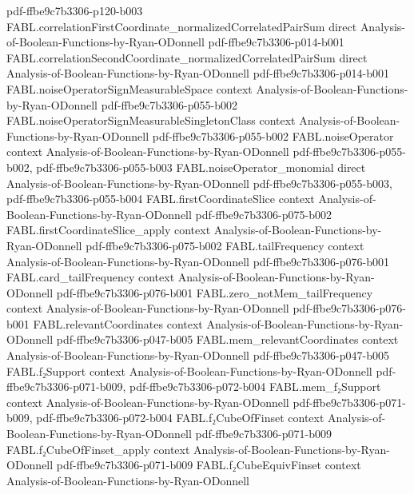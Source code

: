 \begin{theorem}
  {pdf-ffbe9c7b3306-p120-b003}
\proofstep
  {FABL.correlationFirstCoordinate_normalizedCorrelatedPairSum}
  {direct}
  {Analysis-of-Boolean-Functions-by-Ryan-ODonnell}
  {pdf-ffbe9c7b3306-p014-b001}
\proofstep
  {FABL.correlationSecondCoordinate_normalizedCorrelatedPairSum}
  {direct}
  {Analysis-of-Boolean-Functions-by-Ryan-ODonnell}
  {pdf-ffbe9c7b3306-p014-b001}
\proofstep
  {FABL.noiseOperatorSignMeasurableSpace}
  {context}
  {Analysis-of-Boolean-Functions-by-Ryan-ODonnell}
  {pdf-ffbe9c7b3306-p055-b002}
\proofstep
  {FABL.noiseOperatorSignMeasurableSingletonClass}
  {context}
  {Analysis-of-Boolean-Functions-by-Ryan-ODonnell}
  {pdf-ffbe9c7b3306-p055-b002}
\proofstep
  {FABL.noiseOperator}
  {context}
  {Analysis-of-Boolean-Functions-by-Ryan-ODonnell}
  {pdf-ffbe9c7b3306-p055-b002,
    pdf-ffbe9c7b3306-p055-b003}
\proofstep
  {FABL.noiseOperator_monomial}
  {direct}
  {Analysis-of-Boolean-Functions-by-Ryan-ODonnell}
  {pdf-ffbe9c7b3306-p055-b003,
    pdf-ffbe9c7b3306-p055-b004}
\proofstep
  {FABL.firstCoordinateSlice}
  {context}
  {Analysis-of-Boolean-Functions-by-Ryan-ODonnell}
  {pdf-ffbe9c7b3306-p075-b002}
\proofstep
  {FABL.firstCoordinateSlice_apply}
  {context}
  {Analysis-of-Boolean-Functions-by-Ryan-ODonnell}
  {pdf-ffbe9c7b3306-p075-b002}
\proofstep
  {FABL.tailFrequency}
  {context}
  {Analysis-of-Boolean-Functions-by-Ryan-ODonnell}
  {pdf-ffbe9c7b3306-p076-b001}
\proofstep
  {FABL.card_tailFrequency}
  {context}
  {Analysis-of-Boolean-Functions-by-Ryan-ODonnell}
  {pdf-ffbe9c7b3306-p076-b001}
\proofstep
  {FABL.zero_notMem_tailFrequency}
  {context}
  {Analysis-of-Boolean-Functions-by-Ryan-ODonnell}
  {pdf-ffbe9c7b3306-p076-b001}
\proofstep
  {FABL.relevantCoordinates}
  {context}
  {Analysis-of-Boolean-Functions-by-Ryan-ODonnell}
  {pdf-ffbe9c7b3306-p047-b005}
\proofstep
  {FABL.mem_relevantCoordinates}
  {context}
  {Analysis-of-Boolean-Functions-by-Ryan-ODonnell}
  {pdf-ffbe9c7b3306-p047-b005}
\proofstep
  {FABL.f₂Support}
  {context}
  {Analysis-of-Boolean-Functions-by-Ryan-ODonnell}
  {pdf-ffbe9c7b3306-p071-b009,
    pdf-ffbe9c7b3306-p072-b004}
\proofstep
  {FABL.mem_f₂Support}
  {context}
  {Analysis-of-Boolean-Functions-by-Ryan-ODonnell}
  {pdf-ffbe9c7b3306-p071-b009,
    pdf-ffbe9c7b3306-p072-b004}
\proofstep
  {FABL.f₂CubeOfFinset}
  {context}
  {Analysis-of-Boolean-Functions-by-Ryan-ODonnell}
  {pdf-ffbe9c7b3306-p071-b009}
\proofstep
  {FABL.f₂CubeOfFinset_apply}
  {context}
  {Analysis-of-Boolean-Functions-by-Ryan-ODonnell}
  {pdf-ffbe9c7b3306-p071-b009}
\proofstep
  {FABL.f₂CubeEquivFinset}
  {context}
  {Analysis-of-Boolean-Functions-by-Ryan-ODonnell}

\end{theorem}
